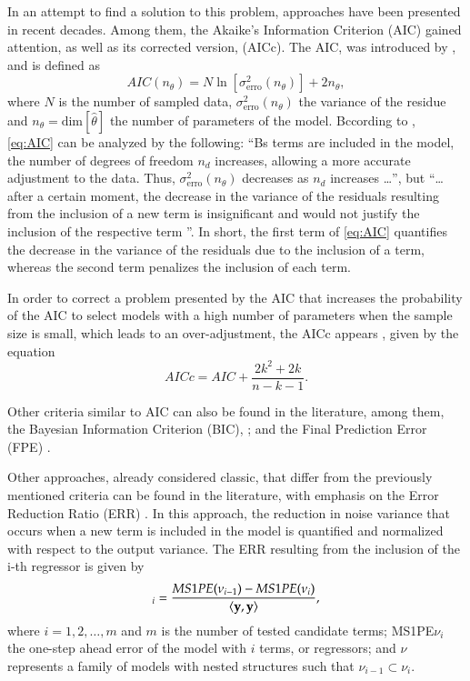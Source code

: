 In an attempt to find a solution to this problem, approaches have been presented in recent decades.
Among them, the Akaike’s Information Criterion (AIC) gained attention, as well as its corrected version, (AICc).
The AIC, was introduced by \cite{akaike1974}, and is defined as
\begin{equation}
   AIC(n_\theta) = N \ln[\sigma^2_{\text{erro}}(n_\theta)] + 2 n _\theta
   \label{eq:AIC},
\end{equation}
where $N$ is the number of sampled data, $\sigma^2_{\text{erro}}(n_\theta)$ the variance of the residue and $n_\theta = \text{dim}[\hat {\theta}]$ the number of parameters of the model.
Bccording to \cite{aguirre2015}, \eqref{eq:AIC} can be analyzed by the following: ``Bs terms are included in the model, the number of degrees of freedom $n_d$ increases, allowing a more accurate adjustment to the data. Thus, $\sigma^2_{\text{erro}}(n_\theta)$ decreases as $n_d$ increases \dots'',
but ``\dots after a certain moment, the decrease in the variance of the residuals resulting from the inclusion of a new term is insignificant and would not justify the inclusion of the respective term ''.
In short, the first term of \eqref{eq:AIC} quantifies the decrease in the variance of the residuals due to the inclusion of a term, whereas the second term penalizes the inclusion of each term.

In order to correct a problem presented by the AIC that increases the probability of the AIC to select models with a high number of parameters when the sample size is small, which leads to an over-adjustment, the AICc appears \citep{cavanaugh1997}, given by the equation
\begin{equation}
   AICc = AIC + \frac{2k^2+2k}{n-k-1}
   \label{eq:AICc}.
\end{equation}

Other criteria similar to AIC can also be found in the literature, among them, the Bayesian Information Criterion (BIC), \citep{schwarz1978}; and the Final Prediction Error (FPE) \citep{kashyap1977}.

Other approaches, already considered classic, that differ from the previously mentioned criteria can be found in the literature, with emphasis on the Error Reduction Ratio (ERR) \citep{billings1989}.
In this approach, the reduction in noise variance that occurs when a new term is included in the model is quantified and normalized with respect to the output variance.
The ERR resulting from the inclusion of the i-th regressor is given by
\begin{equation}
   [\text{ERR}]_i  = \frac{MS1PE(\nu_{i-1})-MS1PE(\nu_i)}{\langle\vy,\vy\rangle}
   \label{eq:ERR},
\end{equation}
where $i = 1, 2, \dots, m$ and $m$ is the number of tested candidate terms; MS1PE$\nu_i$ the one-step ahead error of the model with $i$ terms, or regressors; and $\nu$ represents a family of models with nested structures such that $\nu_{i-1} \subset \nu_i$.

